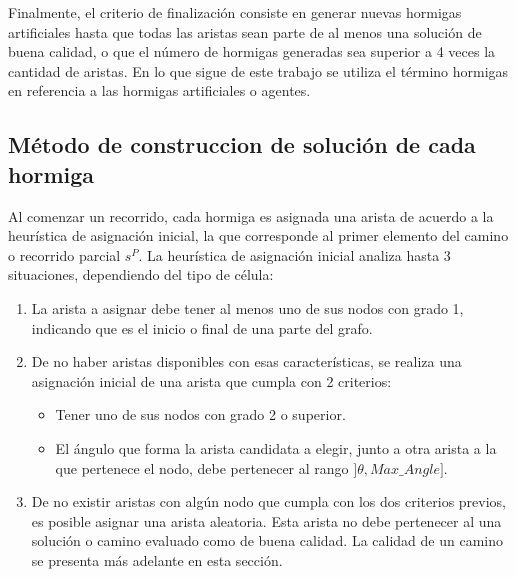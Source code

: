 Finalmente, el criterio de finalizaci\'on consiste en generar nuevas hormigas artificiales hasta que todas las aristas sean parte de al menos una soluci\'on de buena calidad, o que el n\'umero de hormigas generadas sea superior a 4 veces la cantidad de aristas. En lo que sigue de este trabajo se utiliza el t\'ermino hormigas en referencia a las hormigas artificiales o agentes.


\subsection{M\'etodo de construccion de soluci\'on de cada hormiga}
\label{subsubsec:antTourInit}
Al comenzar un recorrido, cada hormiga es asignada una arista de acuerdo a la heur\'istica de asignaci\'on inicial, la que corresponde al primer elemento del camino o recorrido parcial $s^{P}$. La heur\'istica de asignaci\'on inicial analiza hasta 3 situaciones, dependiendo del tipo de c\'elula:
\begin{enumerate}
\item La arista a asignar debe tener al menos uno de sus nodos con grado 1, indicando que es el inicio o final de una parte del grafo.

\item De no haber aristas disponibles con esas caracter\'isticas, se realiza una asignaci\'on inicial de una arista que cumpla con 2 criterios:
\begin{itemize}
    \item Tener uno de sus nodos con grado 2 o superior.
    \item El \'angulo que forma la arista candidata a elegir, junto a otra arista a la que pertenece el nodo, debe pertenecer al rango $]\theta, Max\_Angle]$.
\end{itemize}

\item De no existir aristas con alg\'un nodo que cumpla con los dos criterios previos, es posible asignar una arista aleatoria. Esta arista no debe pertenecer al una soluci\'on o camino evaluado como de buena calidad. La calidad de un camino se presenta m\'as adelante en esta secci\'on.
\end{enumerate}

